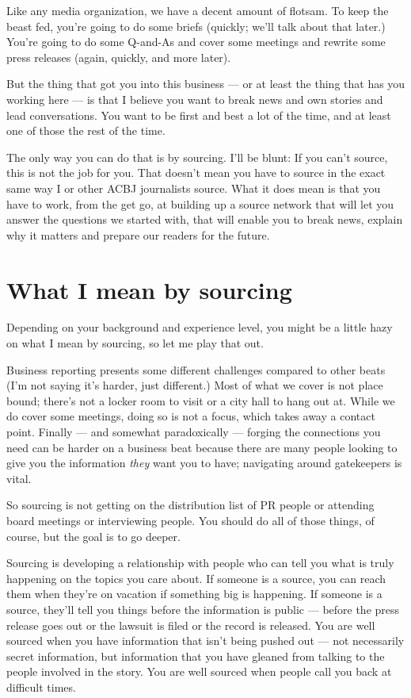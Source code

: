 \documentclass[
  12pt,
  american,
  letterpaperpaper,
  extrafontsizes,onecolumn,openright
  ]{memoir}
\begin{document}
Like any media organization, we have a decent amount of flotsam. To keep the beast fed, you're going to do some briefs (quickly; we'll talk about that later.) You're going to do some Q-and-As and cover some meetings and rewrite some press releases (again, quickly, and more later).

But the thing that got you into this business --- or at least the thing that has you working here --- is that I believe you want to break news and own stories and lead conversations. You want to be first and best a lot of the time, and at least one of those the rest of the time.

The only way you can do that is by sourcing. I'll be blunt: If you can't source, this is not the job for you. That doesn't mean you have to source in the exact same way I or other ACBJ journalists source. What it does mean is that you have to work, from the get go, at building up a source network that will let you answer the questions we started with, that will enable you to break news, explain why it matters and prepare our readers for the future.

\hypertarget{what-i-mean-by-sourcing}{%
\section*{What I mean by sourcing}\label{what-i-mean-by-sourcing}}

Depending on your background and experience level, you might be a little hazy on what I mean by sourcing, so let me play that out.

Business reporting presents some different challenges compared to other beats (I'm not saying it's harder, just different.) Most of what we cover is not place bound; there's not a locker room to visit or a city hall to hang out at. While we do cover some meetings, doing so is not a focus, which takes away a contact point. Finally --- and somewhat paradoxically --- forging the connections you need can be harder on a business beat because there are many people looking to give you the information \emph{they} want you to have; navigating around gatekeepers is vital.

So sourcing is not getting on the distribution list of PR people or attending board meetings or interviewing people. You should do all of those things, of course, but the goal is to go deeper.

Sourcing is developing a relationship with people who can tell you what is truly happening on the topics you care about. If someone is a source, you can reach them when they're on vacation if something big is happening. If someone is a source, they'll tell you things before the information is public --- before the press release goes out or the lawsuit is filed or the record is released. You are well sourced when you have information that isn't being pushed out --- not necessarily secret information, but information that you have gleaned from talking to the people involved in the story. You are well sourced when people call you back at difficult times.
\end{document}
